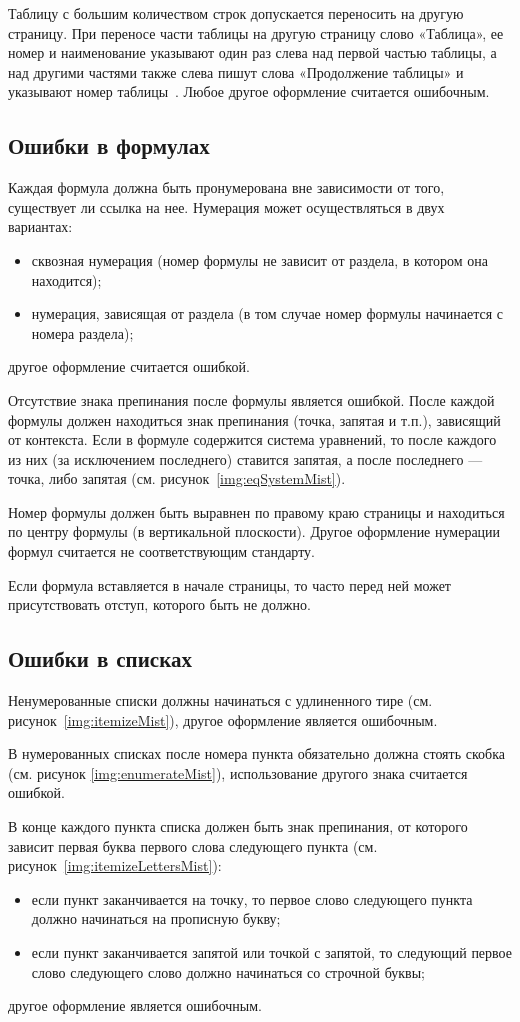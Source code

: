 Таблицу с большим количеством строк допускается переносить на другую страницу. При переносе части таблицы на другую страницу слово «Таблица», ее номер и наименование указывают один раз слева над первой частью таблицы, а над другими частями также слева пишут слова «Продолжение таблицы» и указывают номер таблицы~\cite{GOST732}. Любое другое оформление считается ошибочным.

\subsection{Ошибки в формулах}
Каждая формула должна быть пронумерована вне зависимости от того, существует ли ссылка на нее. Нумерация может осуществляться в двух вариантах:
\begin{itemize}
	\item сквозная нумерация (номер формулы не зависит от раздела, в котором она находится);
	\item нумерация, зависящая от раздела (в том случае номер формулы начинается с номера раздела);
\end{itemize}
другое оформление считается ошибкой.

Отсутствие знака препинания после формулы является ошибкой. После каждой формулы должен находиться знак препинания (точка, запятая и т.п.), зависящий от контекста. Если в формуле содержится система уравнений, то после каждого из них (за исключением последнего) ставится запятая, а после последнего --- точка, либо запятая (см. рисунок~\ref{img:eqSystemMist}).

Номер формулы должен быть выравнен по правому краю страницы и находиться по центру формулы (в вертикальной плоскости). Другое оформление нумерации формул считается не соответствующим стандарту.

Если формула вставляется в начале страницы, то часто перед ней может присутствовать отступ, которого быть не должно.

\subsection{Ошибки в списках}
Ненумерованные списки должны начинаться с удлиненного тире (см. рисунок~\ref{img:itemizeMist}), другое оформление является ошибочным.

В нумерованных списках после номера пункта обязательно должна стоять скобка (см. рисунок \ref{img:enumerateMist}), использование другого знака считается ошибкой.

В конце каждого пункта списка должен быть знак препинания, от которого зависит первая буква первого слова следующего пункта (см. рисунок~\ref{img:itemizeLettersMist}):
\begin{itemize}
	\item если пункт заканчивается на точку, то первое слово следующего пункта должно начинаться на прописную букву;
	\item если пункт заканчивается запятой или точкой с запятой, то следующий первое слово следующего слово должно начинаться со строчной буквы;
\end{itemize}
другое оформление является ошибочным.

